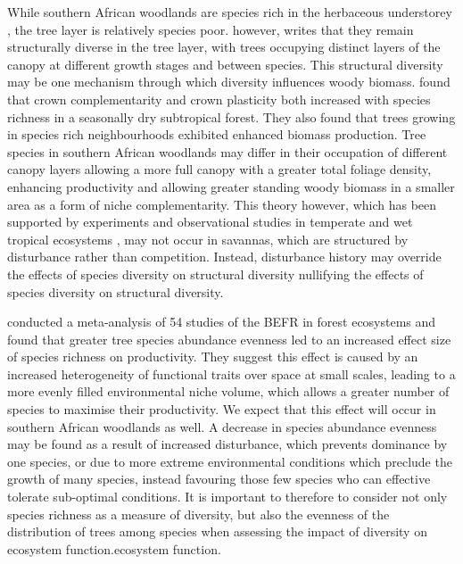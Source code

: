 \documentclass[11pt,a4paper]{article}
\begin{document}

While southern African woodlands are species rich in the herbaceous understorey \citep{Murphy2016}, the tree layer is relatively species poor. \citet{Solbrig1996} however, writes that they remain structurally diverse in the tree layer, with trees occupying distinct layers of the canopy at different growth stages and between species. This structural diversity may be one mechanism through which diversity influences woody biomass. \citep{Kunz2019} found that crown complementarity and crown plasticity both increased with species richness in a seasonally dry subtropical forest. They also found that trees growing in species rich neighbourhoods exhibited enhanced biomass production. Tree species in southern African woodlands may differ in their occupation of different canopy layers allowing a more full canopy with a greater total foliage density, enhancing productivity and allowing greater standing woody biomass in a smaller area as a form of niche complementarity. This theory however, which has been supported by experiments and observational studies in temperate and wet tropical ecosystems \citep{Hardiman2011, Stark2012}, may not occur in savannas, which are structured by disturbance rather than competition. Instead, disturbance history may override the effects of species diversity on structural diversity nullifying the effects of species diversity on structural diversity.

\citep{Zhang2012} conducted a meta-analysis of 54 studies of the BEFR in forest ecosystems and found that greater tree species abundance evenness led to an increased effect size of species richness on productivity. They suggest this effect is caused by an increased heterogeneity of functional traits over space at small scales, leading to a more evenly filled environmental niche volume, which allows a greater number of species to maximise their productivity. We expect that this effect will occur in southern African woodlands as well. A decrease in species abundance evenness may be found as a result of increased disturbance, which prevents dominance by one species, or due to more extreme environmental conditions which preclude the growth of many species, instead favouring those few species who can effective tolerate sub-optimal conditions. It is important to therefore to consider not only species richness as a measure of diversity, but also the evenness of the distribution of trees among species when assessing the impact of diversity on ecosystem function.ecosystem function.
\end{document}
